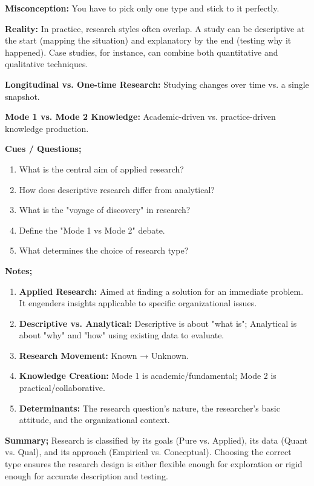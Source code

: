 \documentclass{report}
\begin{document}
\begin{misconception}
    \textbf{Misconception:} You have to pick only one type and stick to it perfectly.
    
    
    \textbf{Reality:} In practice, research styles often overlap. A study can be descriptive at the start (mapping the situation) and explanatory by the end (testing why it happened). Case studies, for instance, can combine both quantitative and qualitative techniques.
\end{misconception}

\begin{optionalExplore}
    \textbf{Longitudinal vs. One-time Research:} Studying changes over time vs. a single snapshot.
    
    
    \textbf{Mode 1 vs. Mode 2 Knowledge:} Academic-driven vs. practice-driven knowledge production.
\end{optionalExplore}

\begin{cornellnotes}
    \textbf{Cues / Questions;}
    \begin{enumerate}
        \item What is the central aim of applied research?
        \item How does descriptive research differ from analytical?
        \item What is the "voyage of discovery" in research?
        \item Define the "Mode 1 vs Mode 2" debate.
        \item What determines the choice of research type?
    \end{enumerate}
    \textbf{Notes;}
    \begin{enumerate}
        \item \textbf{Applied Research:} Aimed at finding a solution for an immediate problem. It engenders insights applicable to specific organizational issues.
        \item \textbf{Descriptive vs. Analytical:} Descriptive is about "what is"; Analytical is about "why" and "how" using existing data to evaluate.
        \item \textbf{Research Movement:} Known → Unknown.
        \item \textbf{Knowledge Creation:} Mode 1 is academic/fundamental; Mode 2 is practical/collaborative.
        \item \textbf{Determinants:} The research question's nature, the researcher's basic attitude, and the organizational context.
    \end{enumerate}
    \textbf{Summary;}
    Research is classified by its goals (Pure vs. Applied), its data (Quant vs. Qual), and its approach (Empirical vs. Conceptual). Choosing the correct type ensures the research design is either flexible enough for exploration or rigid enough for accurate description and testing.
\end{cornellnotes}
\end{document}
